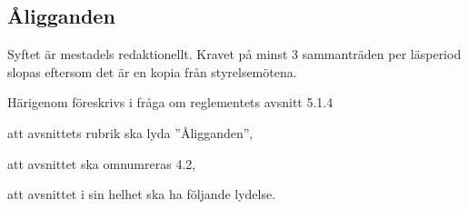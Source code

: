 \documentclass{article}
\begin{document}
\subsection{Åligganden}
Syftet är mestadels redaktionellt.
Kravet på minst 3 sammanträden per läsperiod slopas eftersom det är en kopia från styrelsemötena.


Härigenom föreskrivs i fråga om reglementets avsnitt 5.1.4

\begin{dels}
    \item att avsnittets rubrik ska lyda ''Åligganden'',
    \item att avsnittet ska omnumreras 4.2,
    \item att avsnittet i sin helhet ska ha följande lydelse.
\end{dels}
\end{document}
